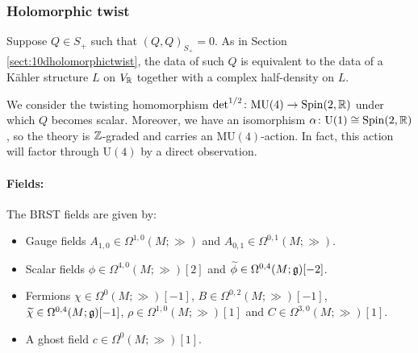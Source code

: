 \documentclass[10pt, oneside]{article}
\newcommand{\MU}{\mathrm{MU}}
\renewcommand{\U}{\mathrm{U}}
\begin{document}
\subsubsection{Holomorphic twist}
\label{sect:8dholomorphictwist}

Suppose $Q\in S_+$ such that $(Q, Q)_{S_+}=0$. As in Section \ref{sect:10dholomorphictwist}, the data of such $Q$ is equivalent to the data of a K\"ahler structure $L$ on $V_\mathbb R$ together with a complex half-density on $L$.

We consider the twisting homomorphism $\det^{1/2}\colon \MU(4)\rightarrow \Spin(2, \RR)$ under which $Q$ becomes scalar. Moreover, we have an isomorphism $\alpha\colon \U(1)\cong\Spin(2, \RR)$, so the theory is $\mathbb Z$-graded and carries an $\MU(4)$-action. In fact, this action will factor through $\U(4)$ by a direct observation.

\vspace{-10pt}
\paragraph{Fields:} The BRST fields are given by:
\begin{itemize}
\item Gauge fields $A_{1, 0}\in\Omega^{1, 0}(M; \gg)$ and $A_{0, 1}\in\Omega^{0, 1}(M; \gg)$.
\item Scalar fields $\phi\in\Omega^{4,0}(M; \gg)[2]$ and $\widetilde{\phi}\in\Omega^{0, 4}(M; \mathfrak{g})[-2]$.
\item Fermions $\chi\in\Omega^0(M; \gg)[-1]$, $B\in\Omega^{0, 2}(M; \gg)[-1]$, $\widetilde{\chi}\in\Omega^{0, 4}(M; \mathfrak{g})[-1]$, $\rho\in\Omega^{1, 0}(M; \gg)[1]$ and $C\in\Omega^{3, 0}(M; \gg)[1]$.
\item A ghost field $c\in \Omega^0(M; \gg)[1]$.
\end{itemize}
\end{document}
